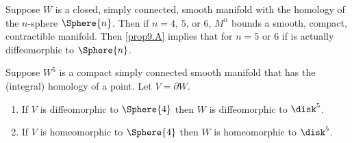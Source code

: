 \begin{theorem}\label{thm9.1.1}
	Suppose $W$ is a closed, simply connected, smooth manifold with
	the homology of the $n$-sphere $\Sphere{n}$. Then if $n =4$, $5$, or $6$, $M^n$
	bounds a smooth, compact, contractible manifold.
	Then \cref{prop9.A} implies that for $n =5$ or $6$ if is actually diffeomorphic to $\Sphere{n}$.
\end{theorem}

\begin{proposition}\label{prop9.C}
	Suppose $W^5$ is a compact simply connected smooth manifold that has
	the (integral) homology of a point. Let $V = \partial W$.
	\begin{enumerate}[label={\upshape{(C.\arabic*)}},leftmargin=1.5cm]
		\item\label{prop9.C.1} If $V$ is diffeomorphic to $\Sphere{4}$ then $W$ is diffeomorphic to $\disk^5$.
		
		\item\label{prop9.C.2} If $V$ is homeomorphic to $\Sphere{4}$ then $W$ is homeomorphic to $\disk^5$.
	\end{enumerate}
\end{proposition}
